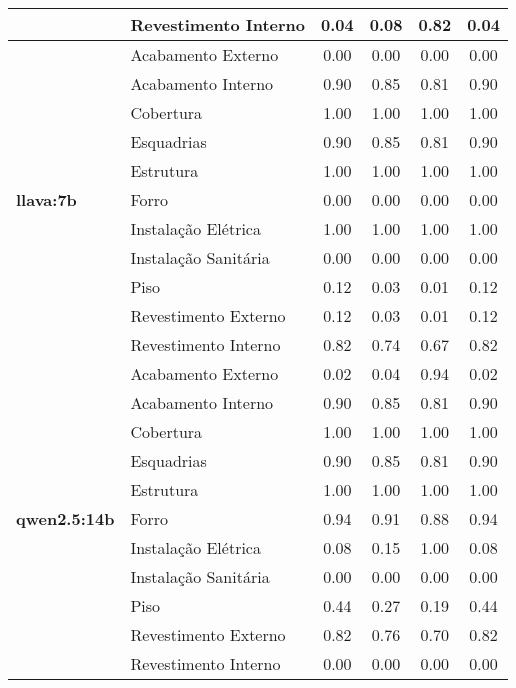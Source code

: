 \begin{table}[htbp]
\begin{tabular}{llcccc}
     & \multirow{1}{*}{Revestimento Interno} & 0.04 & 0.08 & 0.82 & 0.04 \\
    \midrule
    \multirow{11}{*}{\textbf{llava:7b}} & \multirow{1}{*}{Acabamento Externo} & 0.00 & 0.00 & 0.00 & 0.00 \\
     & \multirow{1}{*}{Acabamento Interno} & 0.90 & 0.85 & 0.81 & 0.90 \\
     & \multirow{1}{*}{Cobertura} & 1.00 & 1.00 & 1.00 & 1.00 \\
     & \multirow{1}{*}{Esquadrias} & 0.90 & 0.85 & 0.81 & 0.90 \\
     & \multirow{1}{*}{Estrutura} & 1.00 & 1.00 & 1.00 & 1.00 \\
     & \multirow{1}{*}{Forro} & 0.00 & 0.00 & 0.00 & 0.00 \\
     & \multirow{1}{*}{Instalação Elétrica} & 1.00 & 1.00 & 1.00 & 1.00 \\
     & \multirow{1}{*}{Instalação Sanitária} & 0.00 & 0.00 & 0.00 & 0.00 \\
     & \multirow{1}{*}{Piso} & 0.12 & 0.03 & 0.01 & 0.12 \\
     & \multirow{1}{*}{Revestimento Externo} & 0.12 & 0.03 & 0.01 & 0.12 \\
     & \multirow{1}{*}{Revestimento Interno} & 0.82 & 0.74 & 0.67 & 0.82 \\
    \midrule
    \multirow{11}{*}{\textbf{qwen2.5:14b}} & \multirow{1}{*}{Acabamento Externo} & 0.02 & 0.04 & 0.94 & 0.02 \\
     & \multirow{1}{*}{Acabamento Interno} & 0.90 & 0.85 & 0.81 & 0.90 \\
     & \multirow{1}{*}{Cobertura} & 1.00 & 1.00 & 1.00 & 1.00 \\
     & \multirow{1}{*}{Esquadrias} & 0.90 & 0.85 & 0.81 & 0.90 \\
     & \multirow{1}{*}{Estrutura} & 1.00 & 1.00 & 1.00 & 1.00 \\
     & \multirow{1}{*}{Forro} & 0.94 & 0.91 & 0.88 & 0.94 \\
     & \multirow{1}{*}{Instalação Elétrica} & 0.08 & 0.15 & 1.00 & 0.08 \\
     & \multirow{1}{*}{Instalação Sanitária} & 0.00 & 0.00 & 0.00 & 0.00 \\
     & \multirow{1}{*}{Piso} & 0.44 & 0.27 & 0.19 & 0.44 \\
     & \multirow{1}{*}{Revestimento Externo} & 0.82 & 0.76 & 0.70 & 0.82 \\
     & \multirow{1}{*}{Revestimento Interno} & 0.00 & 0.00 & 0.00 & 0.00 \\

\end{tabular}
\end{table}
